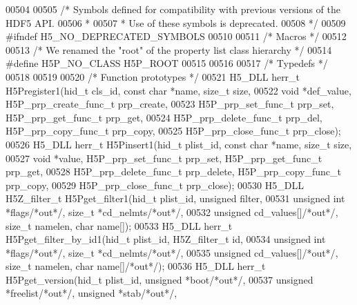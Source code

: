 \begin{DoxyCode}
00504 
00505 \textcolor{comment}{/* Symbols defined for compatibility with previous versions of the HDF5 API.}
00506 \textcolor{comment}{ *}
00507 \textcolor{comment}{ * Use of these symbols is deprecated.}
00508 \textcolor{comment}{ */}
00509 \textcolor{preprocessor}{#ifndef H5\_NO\_DEPRECATED\_SYMBOLS}
00510 
00511 \textcolor{comment}{/* Macros */}
00512 
00513 \textcolor{comment}{/* We renamed the "root" of the property list class hierarchy */}
00514 \textcolor{preprocessor}{#define H5P\_NO\_CLASS            H5P\_ROOT}
00515 
00516 
00517 \textcolor{comment}{/* Typedefs */}
00518 
00519 
00520 \textcolor{comment}{/* Function prototypes */}
00521 H5\_DLL herr\_t H5Pregister1(hid\_t cls\_id, \textcolor{keyword}{const} \textcolor{keywordtype}{char} *name, \textcolor{keywordtype}{size\_t} size,
00522     \textcolor{keywordtype}{void} *def\_value, H5P\_prp\_create\_func\_t prp\_create,
00523     H5P\_prp\_set\_func\_t prp\_set, H5P\_prp\_get\_func\_t prp\_get,
00524     H5P\_prp\_delete\_func\_t prp\_del, H5P\_prp\_copy\_func\_t prp\_copy,
00525     H5P\_prp\_close\_func\_t prp\_close);
00526 H5\_DLL herr\_t H5Pinsert1(hid\_t plist\_id, \textcolor{keyword}{const} \textcolor{keywordtype}{char} *name, \textcolor{keywordtype}{size\_t} size,
00527     \textcolor{keywordtype}{void} *value, H5P\_prp\_set\_func\_t prp\_set, H5P\_prp\_get\_func\_t prp\_get,
00528     H5P\_prp\_delete\_func\_t prp\_delete, H5P\_prp\_copy\_func\_t prp\_copy,
00529     H5P\_prp\_close\_func\_t prp\_close);
00530 H5\_DLL H5Z\_filter\_t H5Pget\_filter1(hid\_t plist\_id, \textcolor{keywordtype}{unsigned} filter,
00531     \textcolor{keywordtype}{unsigned} \textcolor{keywordtype}{int} *flags\textcolor{comment}{/*out*/}, \textcolor{keywordtype}{size\_t} *cd\_nelmts\textcolor{comment}{/*out*/},
00532     \textcolor{keywordtype}{unsigned} cd\_values[]\textcolor{comment}{/*out*/}, \textcolor{keywordtype}{size\_t} namelen, \textcolor{keywordtype}{char} name[]);
00533 H5\_DLL herr\_t H5Pget\_filter\_by\_id1(hid\_t plist\_id, H5Z\_filter\_t \textcolor{keywordtype}{id},
00534     \textcolor{keywordtype}{unsigned} \textcolor{keywordtype}{int} *flags\textcolor{comment}{/*out*/}, \textcolor{keywordtype}{size\_t} *cd\_nelmts\textcolor{comment}{/*out*/},
00535     \textcolor{keywordtype}{unsigned} cd\_values[]\textcolor{comment}{/*out*/}, \textcolor{keywordtype}{size\_t} namelen, \textcolor{keywordtype}{char} name[]\textcolor{comment}{/*out*/});
00536 H5\_DLL herr\_t H5Pget\_version(hid\_t plist\_id, \textcolor{keywordtype}{unsigned} *boot\textcolor{comment}{/*out*/},
00537          \textcolor{keywordtype}{unsigned} *freelist\textcolor{comment}{/*out*/}, \textcolor{keywordtype}{unsigned} *stab\textcolor{comment}{/*out*/},

\end{DoxyCode}
